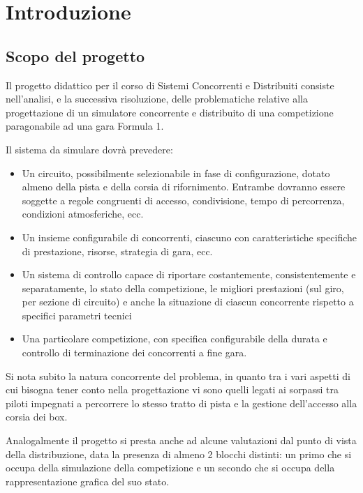 \documentclass[a4paper,11pt, twoside]{book}
\begin{document}
  \tableofcontents
  \newpage
  
  \chapter{Introduzione}
    \setcounter{page}{1}
    
    \section{Scopo del progetto}
      Il progetto didattico per il corso di Sistemi Concorrenti e Distribuiti consiste nell'analisi, e la
      successiva risoluzione,
      delle problematiche relative alla progettazione di un simulatore concorrente e distribuito 
      di una competizione paragonabile ad una gara Formula 1.
      
      Il sistema da simulare dovrà prevedere:
      \begin{itemize}
	\item Un circuito, possibilmente selezionabile in fase di configurazione, dotato almeno della pista e della corsia di 
	  rifornimento.
	  Entrambe dovranno essere soggette a regole congruenti di accesso, condivisione, 
	  tempo di percorrenza, condizioni atmosferiche, ecc.
	\item Un insieme configurabile di concorrenti, ciascuno con caratteristiche specifiche di prestazione, risorse, 
	  strategia di gara, ecc.
	\item Un sistema di controllo capace di riportare costantemente, consistentemente e separatamente, 
	  lo stato della competizione, le migliori prestazioni (sul giro, per sezione di circuito) e anche la 
	  situazione di ciascun concorrente rispetto a specifici parametri tecnici
	\item Una particolare competizione, con specifica configurabile della durata e controllo di terminazione 
	  dei concorrenti a fine gara.
      \end{itemize}
      
      Si nota subito la natura concorrente del problema, in quanto tra i vari aspetti di cui bisogna tener conto
      nella progettazione vi sono quelli legati ai sorpassi tra piloti impegnati a percorrere lo stesso tratto di pista
      e la gestione dell'accesso alla corsia dei box.
      
      Analogalmente il progetto si presta anche ad alcune valutazioni dal punto di vista della distribuzione, data
      la presenza di almeno 2 blocchi distinti: un primo che si occupa della simulazione della competizione e un secondo
      che si occupa della rappresentazione grafica del suo stato.
      
\end{document}

